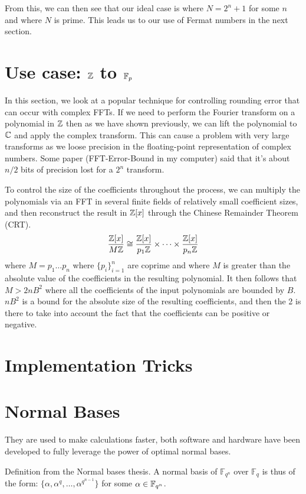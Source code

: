 From this, we can then see that our ideal case is where $N = 2^n + 1$ for some $n$ and where $N$ is prime. This leads us to our use of Fermat numbers in the next section.

\section{Use case: ${\mathbb Z}$ to $\mathbb{F}_p$}\label{sec:Z-Fp}

In this section, we look at a popular technique for controlling rounding error that can occur with complex FFTs. If we need to perform the Fourier transform on a polynomial in ${\mathbb Z}$ then as we have shown previously, we can lift the polynomial to $\mathbb{C}$ and apply the complex transform. This can cause a problem with very large transforms as we loose precision in the floating-point representation of complex numbers. Some paper (FFT-Error-Bound in my computer) said that it's about $n / 2$ bits of precision lost for a $2^n$ transform. 

To control the size of the coefficients throughout the process, we can multiply the polynomials via an FFT in several finite fields of relatively small coefficient sizes, and then reconstruct the result in ${\mathbb Z}[x]$ through the Chinese Remainder Theorem (CRT).
\[
    \frac{{\mathbb Z}[x]}{M{\mathbb Z}} \cong \frac{{\mathbb Z}[x]}{p_1{\mathbb Z}} \times \cdots \times \frac{{\mathbb Z}[x]}{p_n{\mathbb Z}}
\]
where $M = p_1 \ldots p_n$ where $\{p_i\}_{i=1}^n$ are coprime and where $M$ is greater than the absolute value of the coefficients in the resulting polynomial. It then follows that $M > 2nB^2$ where all the coefficients of the input polynomials are bounded by $B$. $nB^2$ is a bound for the absolute size of the resulting coefficients, and then the 2 is there to take into account the fact that the coefficients can be positive or negative.





\section{Implementation Tricks}
\label{sec:impl-tricks}

\section{Normal Bases}
They are used to make calculations faster,  both software and hardware have been developed to fully leverage the power of optimal normal bases.

Definition from the Normal bases thesis.
A normal basis of $\mathbb{F}_{q^n}$ over $\mathbb{F}_q$ is thus of the form: $\{\alpha,\alpha^q,\ldots ,\alpha^{q^{n-1}}\}$ for some $\alpha \in \mathbb{F}_{q^n}$.

